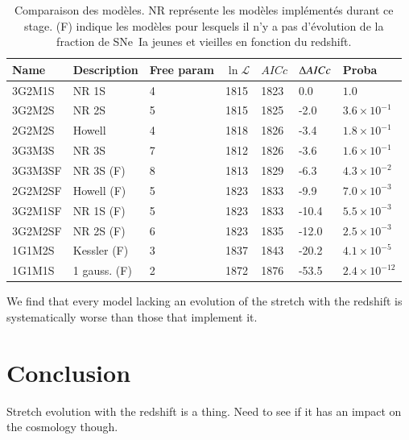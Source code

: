 \documentclass{aa}
\begin{document}
\begin{table}[htbp!]
    \centering
    \caption{Comparaison des modèles. NR représente les modèles implémentés
             durant ce stage. (F) indique les modèles pour lesquels il n'y a pas
             d'évolution de la fraction de SNe~Ia jeunes et vieilles en fonction
             du redshift.}
    \label{tab:comp}
    \begin{tabularx}{\linewidth}{|Y*{6}{|Y}|}\hline

         Name & Description & Free param &
        $\ln\mathcal{L}$ & $AICc$ & $\Delta AICc$ & Proba \\\hline\hline

        3G2M1S & NR 1S & 4 & 1815 & 1823 & 0.0 & $1.0$ \\\hline

        3G2M2S & NR 2S & 5 & 1815  & 1825 & -2.0 & $3.6\times10^{-1}$ \\\hline

        2G2M2S & Howell & 4 & 1818  & 1826 & -3.4 & $1.8\times10^{-1}$ \\\hline

        3G3M3S & NR 3S & 7 & 1812  & 1826 & -3.6 & $1.6\times10^{-1}$ \\\hline

        3G3M3SF & NR 3S (F) & 8 & 1813 & 1829 & -6.3  & $4.3\times10^{-2}$
        \\\hline

        2G2M2SF & Howell (F) & 5 & 1823  & 1833 & -9.9 & $7.0\times10^{-3}$
        \\\hline

        3G2M1SF & NR 1S (F) & 5 & 1823  & 1833 & -10.4 & $5.5\times10^{-3}$
        \\\hline

        3G2M2SF & NR 2S (F) & 6 & 1823  & 1835 & -12.0 & $2.5\times10^{-3}$
        \\\hline

        1G1M2S & Kessler (F) & 3 & 1837  & 1843 & -20.2 & $4.1\times10^{-5}$
        \\\hline

        1G1M1S & 1 gauss. (F) & 2 & 1872 & 1876 & -53.5 &
        $2.4\times10^{-12}$\\\hline

    \end{tabularx}
\end{table}


We find that every model lacking an evolution of the stretch with the redshift
is systematically worse than those that implement it.

\section{Conclusion}
Stretch evolution with the redshift is a thing. Need to see if it has an impact
on the cosmology though.
\end{document}
